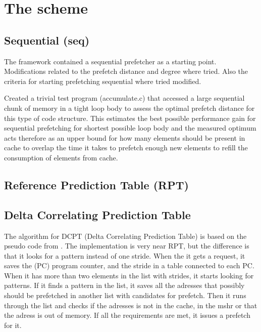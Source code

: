 \chapter{The scheme}

\section{Sequential (seq)}
The framework contained a sequential prefetcher as a starting point.
Modifications related to the prefetch distance and degree where tried.
Also the criteria for starting prefetching sequential where tried modified.


Created a trivial test program (accumulate.c) that accessed a large sequential
chunk of memory in a tight loop body to assess the optimal prefetch distance
for this type of code structure. This estimates the best possible performance
gain for sequential prefetching for shortest possible loop body and the
measured optimum acts therefore as an upper bound for how many elements should
be present in cache to overlap the time it takes to prefetch enough new
elements to refill the consumption of elements from cache.

\section{Reference Prediction Table (RPT)}

\section{Delta Correlating Prediction Table}
The algorithm for DCPT (Delta Correlating Prediction Table) is based on the pseudo code from \cite{dcptpaper}.
The implementation is very near RPT, but the difference is that it looks for a pattern instead of one stride.
When the it gets a request, it saves the (PC) program counter, and the stride in a table connected to each PC. When it has more than two elements in the list with strides, it starts looking for patterns.
If it finds a pattern in the list, it saves all the adresses that possibly should be prefetched in another list with candidates for prefetch.
Then it runs through the list and checks if the adresses is not in the cache, in the mshr or that the adress is out of memory. If all the requirements are met, it issues a prefetch for it.

